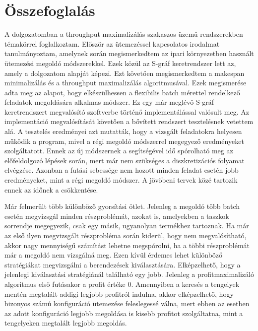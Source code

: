 \chapter{Összefoglalás}
A dolgozatomban a throughput maximalizálás szakaszos üzemű rendszerekben témakörrel foglalkoztam.
Először az ütemezéssel kapcsolatos irodalmat tanulmányoztam, amelynek során megismerkedtem az ipari környezetben használt ütemezési megoldó módszerekkel.
Ezek közül az S-gráf keretrendszer lett az, amely a dolgozatom alapját képezi.
Ezt követően megismerkedtem a makespan minimalizálás és a throughput maximalizálás algoritmusával.
Ezek megismerése adta meg az alapot, hogy elkészülhessen a flexibilis batch mérettel rendelkező feladatok megoldására alkalmas módszer.
Ez egy már meglévő S-gráf keretrendszert megvalósító szoftverbe történő implementálással valósult meg.
Az implementáció megvalósítását követően a bővített rendszert tesztelésnek vetettem alá.
A tesztelés eredményei azt mutatták, hogy a vizsgált feladatokra helyesen működik a program, mivel a régi megoldó módszerrel megegyező eredményeket szolgáltatott.
Ennek az új módszernek a segítségével idő spórolható meg az előfeldolgozó lépések során, mert már nem szükséges a diszkretizációs folyamat elvégzése.
Azonban a futási sebessége nem hozott minden feladat esetén jobb eredményeket, mint a régi megoldó módszer.
A jövőbeni tervek közé tartozik ennek az időnek a csökkentése.

Már felmerült több különböző gyorsítási ötlet.
Jelenleg a megoldó több batch esetén megvizsgál minden részproblémát, azokat is,
amelyekben a taszkok sorrendje megegyezik, csak egy másik, ugyanolyan termékhez tartoznak.
Ha már az első ilyen megvizsgált részprobléma során kiderül, hogy nem megvalósítható, akkor nagy mennyiségű számítást lehetne megspórolni, ha a többi részproblémát már a megoldó nem vizsgálná meg.
Ezen kívül érdemes lehet különböző stratégiákat megvizsgálni a berendezések kiválasztására.
Elképzelhető, hogy a jelenlegi kiválasztási stratégiánál található egy jobb.
Jelenleg a profitmaximalizáló algoritmus első futásakor a profit értéke 0.
Amennyiben a keresés a tengelyek mentén megtalált addigi legjobb profitról indulna, akkor elképzelhető, hogy bizonyos számú konfiguráció ütemezése feleslegessé válna, mert ebben az esetben az adott konfiguráció legjobb megoldása is kisebb profitot szolgáltatna, mint a tengelyeken megtalált legjobb megoldás.
